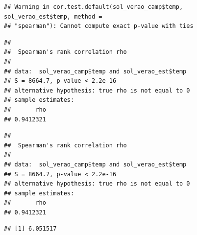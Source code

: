 \documentclass[
]{book}
\newenvironment{Shaded}{\begin{snugshade}}{\end{snugshade}}
\newcommand{\DataTypeTok}[1]{\textcolor[rgb]{0.13,0.29,0.53}{#1}}
\newcommand{\KeywordTok}[1]{\textcolor[rgb]{0.13,0.29,0.53}{\textbf{#1}}}
\newcommand{\NormalTok}[1]{#1}
\newcommand{\OperatorTok}[1]{\textcolor[rgb]{0.81,0.36,0.00}{\textbf{#1}}}
\newcommand{\StringTok}[1]{\textcolor[rgb]{0.31,0.60,0.02}{#1}}
\begin{document}
\begin{Shaded}
\end{Shaded}

\begin{verbatim}
## Warning in cor.test.default(sol_verao_camp$temp, sol_verao_est$temp, method =
## "spearman"): Cannot compute exact p-value with ties
\end{verbatim}

\begin{verbatim}
## 
##  Spearman's rank correlation rho
## 
## data:  sol_verao_camp$temp and sol_verao_est$temp
## S = 8664.7, p-value < 2.2e-16
## alternative hypothesis: true rho is not equal to 0
## sample estimates:
##       rho 
## 0.9412321
\end{verbatim}

\begin{Shaded}
\end{Shaded}

\begin{verbatim}
## 
##  Spearman's rank correlation rho
## 
## data:  sol_verao_camp$temp and sol_verao_est$temp
## S = 8664.7, p-value < 2.2e-16
## alternative hypothesis: true rho is not equal to 0
## sample estimates:
##       rho 
## 0.9412321
\end{verbatim}

\begin{Shaded}
\end{Shaded}

\begin{verbatim}
## [1] 6.051517
\end{verbatim}
\end{document}
